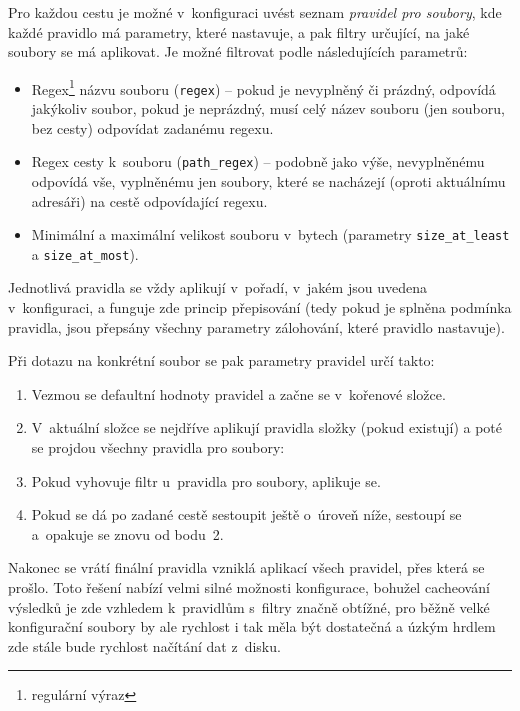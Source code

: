 Pro každou cestu je možné v~konfiguraci uvést seznam {\it pravidel pro soubory},
kde každé pravidlo má parametry, které nastavuje, a pak filtry určující, na jaké
soubory se má aplikovat. Je možné filtrovat podle následujících parametrů:

\begin{itemize}
	\item Regex\footnote{regulární výraz} názvu souboru (\texttt{regex}) --
	pokud je nevyplněný či prázdný, odpovídá jakýkoliv soubor, pokud je
	neprázdný, musí celý název souboru (jen souboru, bez cesty) odpovídat
	zadanému regexu.
	\item Regex cesty k~souboru (\texttt{path\_regex}) -- podobně jako výše,
	nevyplněnému odpovídá vše, vyplněnému jen soubory, které se nacházejí
	(oproti aktuálnímu adresáři) na cestě odpovídající regexu.
	\item Minimální a maximální velikost souboru v~bytech (parametry
	\texttt{size\_at\_least} a \texttt{size\_at\_most}).
\end{itemize}

Jednotlivá pravidla se vždy aplikují v~pořadí, v~jakém jsou uvedena v~konfiguraci,
a funguje zde princip přepisování (tedy pokud je splněna podmínka pravidla, jsou
přepsány všechny parametry zálohování, které pravidlo nastavuje).

\medskip\goodbreak

\noindent Při dotazu na konkrétní soubor se pak parametry pravidel určí takto:
\begin{enumerate}
	\item Vezmou se defaultní hodnoty pravidel a začne se v~kořenové složce.
	\item V~aktuální složce se nejdříve aplikují pravidla složky (pokud
	existují) a poté se projdou všechny pravidla pro soubory:
	\item Pokud vyhovuje filtr u~pravidla pro soubory, aplikuje se.
	\item Pokud se dá po zadané cestě sestoupit ještě o~úroveň níže, sestoupí
	se a~opakuje se znovu od bodu~2.
\end{enumerate}

Nakonec se vrátí finální pravidla vzniklá aplikací všech pravidel, přes která se
prošlo. Toto řešení nabízí velmi silné možnosti konfigurace, bohužel cacheování
výsledků je zde vzhledem k~pravidlům s~filtry značně obtížné, pro běžně velké
konfigurační soubory by ale rychlost i tak měla být dostatečná a úzkým hrdlem
zde stále bude rychlost načítání dat z~disku.

